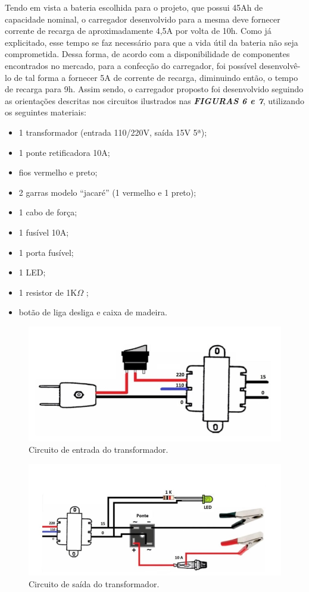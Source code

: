 Tendo em vista a bateria escolhida para o projeto, que possui 45Ah de capacidade nominal, o carregador desenvolvido para a mesma deve fornecer corrente de recarga de aproximadamente 4,5A por volta de 10h. Como já explicitado, esse tempo se faz necessário para que a vida útil da bateria não seja comprometida. Dessa forma, de acordo com a disponibilidade de componentes encontrados no mercado, para a confecção do carregador, foi possível desenvolvê-lo de tal forma a fornecer 5A de corrente de recarga, diminuindo então, o tempo de recarga para 9h. Assim sendo, o carregador proposto foi desenvolvido seguindo as orientações descritas nos circuitos ilustrados nas \textbf{\textit{FIGURAS 6 e 7}}, utilizando os seguintes materiais:

\begin{itemize}
\item 1 transformador (entrada 110/220V, saída 15V 5ª); 
\item 1 ponte retificadora 10A;
\item fios vermelho e preto;
\item 2 garras modelo “jacaré” (1 vermelho e 1 preto);
\item 1 cabo de força;
\item 1 fusível 10A;
\item 1 porta fusível; 
\item 1 LED; 
\item 1 resistor de 1K\(\Omega\) ; 
\item botão de liga desliga e caixa de madeira.
\end{itemize}

\begin{figure}[h!]
  \centering
    \includegraphics[scale=0.5]{figuras/Transformador1.jpg}
  \caption{Circuito de entrada do transformador.}
\end{figure}

\begin{figure}[h!]
  \centering
    \includegraphics[scale=0.5]{figuras/Transformador2.jpg}
  \caption{Circuito de saída do transformador.}
\end{figure}

